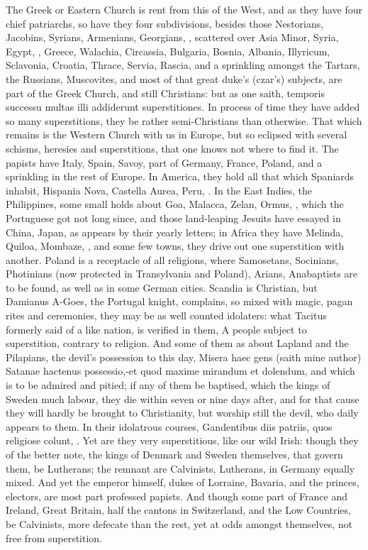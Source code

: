 {The Greek or Eastern Church is rent from this of the West, and as
they have four chief patriarchs, so have they four subdivisions,
besides those Nestorians, Jacobins, Syrians, Armenians, Georgians, \etc{},
scattered over Asia Minor, Syria, Egypt, \etc{}, Greece, Walachia,
Circassia, Bulgaria, Bosnia, Albania, Illyricum, Sclavonia, Croatia,
Thrace, Servia, Rascia, and a sprinkling amongst the Tartars, the
Russians, Muscovites, and most of that great duke's (czar's) subjects,
are part of the Greek Church, and still Christians: but as one
saith, temporis successu multas illi addiderunt superstitiones. In
process of time they have added so many superstitions, they be rather
semi-Christians than otherwise. That which remains is the Western
Church with us in Europe, but so eclipsed with several schisms,
heresies and superstitions, that one knows not where to find it. The
papists have Italy, Spain, Savoy, part of Germany, France, Poland, and
a sprinkling in the rest of Europe. In America, they hold all that
which Spaniards inhabit, Hispania Nova, Castella Aurea, Peru, \etc{}. In
the East Indies, the Philippines, some small holds about Goa, Malacca,
Zelan, Ormus, \etc{}, which the Portuguese got not long since, and those
land-leaping Jesuits have essayed in China, Japan, as appears by their
yearly letters; in Africa they have Melinda, Quiloa, Mombaze, \etc{}, and
some few towns, they drive out one superstition with another. Poland is
a receptacle of all religions, where Samosetans, Socinians, Photinians
(now protected in Transylvania and Poland), Arians, Anabaptists are to
be found, as well as in some German cities. Scandia is Christian, but
Damianus A-Goes, the Portugal knight, complains, so mixed with
magic, pagan rites and ceremonies, they may be as well counted
idolaters: what Tacitus formerly said of a like nation, is verified in
them, A people subject to superstition, contrary to religion. And
some of them as about Lapland and the Pilapians, the devil's possession
to this day, Misera haec gens (saith mine author) Satanae
hactenus possessio,-et quod maxime mirandum et dolendum, and which is
to be admired and pitied; if any of them be baptised, which the kings
of Sweden much labour, they die within seven or nine days after, and
for that cause they will hardly be brought to Christianity, but worship
still the devil, who daily appears to them. In their idolatrous
courses, Gandentibus diis patriis, quos religiose colunt, \etc{}. Yet are
they very superstitious, like our wild Irish: though they of the better
note, the kings of Denmark and Sweden themselves, that govern them, be
Lutherans; the remnant are Calvinists, Lutherans, in Germany equally
mixed. And yet the emperor himself, dukes of Lorraine, Bavaria, and the
princes, electors, are most part professed papists. And though some
part of France and Ireland, Great Britain, half the cantons in
Switzerland, and the Low Countries, be Calvinists, more defecate than
the rest, yet at odds amongst themselves, not free from superstition.

}
